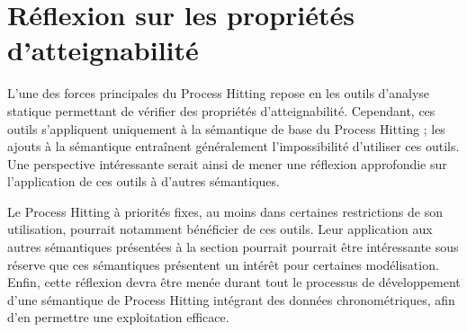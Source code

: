 


\section{Réflexion sur les propriétés d'atteignabilité}

L'une des forces principales du Process Hitting repose en les outils d'analyse statique permettant de vérifier des propriétés d'atteignabilité.
Cependant, ces outils s'appliquent uniquement à la sémantique de base du Process Hitting ;
les ajouts à la sémantique entraînent généralement l'impossibilité d'utiliser ces outils.
Une perspective intéressante serait ainsi de mener une réflexion approfondie sur l'application de ces outils à d'autres sémantiques.

Le Process Hitting à priorités fixes, au moins dans certaines restrictions de son utilisation, pourrait notamment bénéficier de ces outils.
Leur application aux autres sémantiques présentées à la section  pourrait pourrait être intéressante sous réserve que ces sémantiques présentent un intérêt pour certaines modélisation.
Enfin, cette réflexion devra être menée durant tout le processus de développement d'une sémantique de Process Hitting intégrant des données chronométriques,
afin d'en permettre une exploitation efficace.
